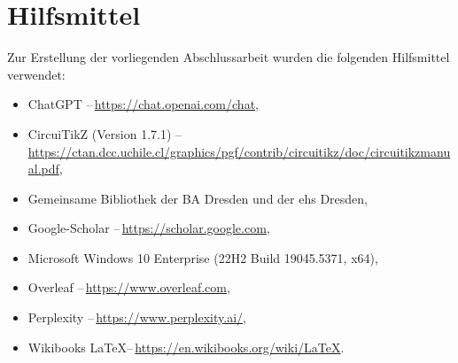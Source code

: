 \renewcommand{\bibname}{Quellenverzeichnis}
% 

%
%
%
\printbibliography

\clearpage\section*{Hilfsmittel}\label{Tools}
Zur Erstellung der vorliegenden Abschlussarbeit wurden die folgenden Hilfsmittel verwendet:
\begin{itemize}
	\item ChatGPT --\,\url{https://chat.openai.com/chat},
    \item CircuiTikZ (Version 1.7.1) --\,\url{https://ctan.dcc.uchile.cl/graphics/pgf/contrib/circuitikz/doc/circuitikzmanual.pdf},
	\item Gemeinsame Bibliothek der BA Dresden und der ehs Dresden,
	\item Google-Scholar --\,\url{https://scholar.google.com},
	\item Microsoft Windows 10 Enterprise (22H2 Build 19045.5371, x64),
	\item Overleaf --\,\url{https://www.overleaf.com},
    \item Perplexity --\,\url{https://www.perplexity.ai/},
    \item Wikibooks \LaTeX --\,\url{https://en.wikibooks.org/wiki/LaTeX}.
\end{itemize}
